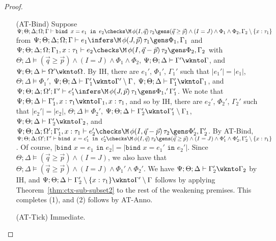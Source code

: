 \begin{proof}
\begin{itemize}
  \item[(AT-Bind)] Suppose
  $\Psi ; \Theta ; \Delta ; \Omega ; \Gamma \vdash \texttt{bind } x = e_1 \texttt{ in } e_2 \checks \M \, \phi(I,\vec{q})\, \tau_2 \gens (\vec{q} \geq \vec{p}) \wedge (I =J)  \wedge \Phi_1 \wedge \Phi_2, \Gamma_2 \setminus \{x : \tau_1\}$ from
  $\Psi ; \Theta ; \Delta ; \Omega ; \Gamma \vdash e_1 \infers \M \, \phi(J,\vec{p})\, \tau_1 \gens \Phi_1,\Gamma_1$ and
  $\Psi ; \Theta; \Delta ; \Omega ; \Gamma_1, x:\tau_1 \vdash e_2 \checks \M \, \phi(I,\vec{q} - \vec{p})\, \tau_2 \gens \Phi_2,\Gamma_2$ with
  $\Theta ; \Delta \vDash (\vec{q} \geq \vec{p}) \wedge (I =J)  \wedge \Phi_1 \wedge \Phi_2$,
  $\Psi ; \Theta ; \Delta \vdash \Gamma' \wknto \Gamma$, and
  $\Psi ; \Theta ; \Delta \vdash \Omega' \wknto \Omega$.
  By IH, there are $e_1'$, $\Phi_1'$, $\Gamma_1'$ such that
  $|e_1'| = |e_1|$,
  $\Theta ; \Delta \vDash \Phi_1'$,
  $\Psi ; \Theta ; \Delta \vdash \Gamma_1' \wknto \Gamma' \setminus \Gamma$,
  $\Psi ; \Theta ; \Delta \vdash \Gamma_1' \wknto \Gamma_1$, and
  $\Psi ; \Theta ; \Delta ; \Omega' ; \Gamma' \vdash e_1' \infers \M \, \phi(J,\vec{p}) \, \tau_1 \gens \Phi_1,'\Gamma_1'$.
  We note that $\Psi ; \Theta ; \Delta \vdash \Gamma_1',x:\tau_1 \wknto \Gamma_1, x: \tau_1$, and so
  by IH, there are $e_2'$, $\Phi_2'$, $\Gamma_2'$ such that
  $|e_2'| = |e_2|$,
  $\Theta ; \Delta \vDash \Phi_2'$,
  $\Psi ; \Theta ; \Delta \vdash \Gamma_2' \wknto \Gamma_1' \setminus \Gamma_1$,
  $\Psi ; \Theta ; \Delta \vdash \Gamma_2' \wknto \Gamma_2$, and
  $\Psi ; \Theta; \Delta ; \Omega' ; \Gamma_1', x:\tau_1 \vdash e_2' \checks \M \, \phi(I,\vec{q} - \vec{p})\, \tau_2 \gens \Phi_2',\Gamma_2'$.
  By AT-Bind,
  $\Psi ; \Theta ; \Delta ; \Omega' ; \Gamma' \vdash \texttt{bind } x = e_1' \texttt{ in } e_2' \checks \M \, \phi(I,\vec{q})\, \tau_2 \gens (\vec{q} \geq \vec{p}) \wedge (I =J)  \wedge \Phi_1' \wedge \Phi_2', \Gamma_2' \setminus \{x : \tau_1\}$.
  Of course, $|\texttt{bind } x = e_1 \texttt{ in } e_2| = |\texttt{bind } x = e_1' \texttt{ in } e_2'|$.
  Since $\Theta ; \Delta \vDash (\vec{q} \geq \vec{p}) \wedge (I=J)$, we also have that $\Theta ; \Delta \vDash (\vec{q} \geq \vec{p}) \wedge (I =J)  \wedge \Phi_1' \wedge \Phi_2'$.
  We have $\Psi ; \Theta ; \Delta \vdash \Gamma_2' \wknto \Gamma_2$  by IH, and
  $\Psi ; \Theta ; \Delta \vdash \Gamma_2' \setminus \{x : \tau_1\} \wknto \Gamma' \setminus \Gamma$ follows by applying Theorem~\ref{thm:ctx-sub-subset2} to the rest of the weakening premises. This completes (1), and (2) follows by AT-Anno.
  
  \item[(AT-Tick)] Immediate.
  

\end{itemize}
\end{proof}
